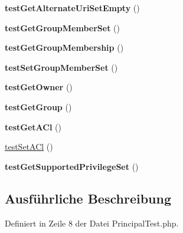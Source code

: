 \begin{DoxyCompactItemize}
{\bfseries test\+Get\+Alternate\+Uri\+Set\+Empty} ()
\item 
\mbox{\label{class_sabre_1_1_d_a_v_a_c_l_1_1_principal_test_af325bbd83431545cb5587f68870c4732}} 
{\bfseries test\+Get\+Group\+Member\+Set} ()
\item 
\mbox{\label{class_sabre_1_1_d_a_v_a_c_l_1_1_principal_test_a02a84103d98290043b4d15bee3043be4}} 
{\bfseries test\+Get\+Group\+Membership} ()
\item 
\mbox{\label{class_sabre_1_1_d_a_v_a_c_l_1_1_principal_test_af71deaaeff46816a259ecf660204a1c1}} 
{\bfseries test\+Set\+Group\+Member\+Set} ()
\item 
\mbox{\label{class_sabre_1_1_d_a_v_a_c_l_1_1_principal_test_a494f603d9cd630b0c55f0ec63707d49e}} 
{\bfseries test\+Get\+Owner} ()
\item 
\mbox{\label{class_sabre_1_1_d_a_v_a_c_l_1_1_principal_test_a3a13e8b6ee9f57ee02257c4c72212630}} 
{\bfseries test\+Get\+Group} ()
\item 
\mbox{\label{class_sabre_1_1_d_a_v_a_c_l_1_1_principal_test_ad8b13dc60d4c10fe8da317d6a0eb9ebd}} 
{\bfseries test\+Get\+A\+Cl} ()
\item 
\mbox{\hyperlink{class_sabre_1_1_d_a_v_a_c_l_1_1_principal_test_a33e587f3020a6605de75adc7e803c461}{test\+Set\+A\+Cl}} ()
\item 
\mbox{\label{class_sabre_1_1_d_a_v_a_c_l_1_1_principal_test_a3028d01a9fd25a3d82c51cbdc52b6c6c}} 
{\bfseries test\+Get\+Supported\+Privilege\+Set} ()
\end{DoxyCompactItemize}


\subsection{Ausführliche Beschreibung}


Definiert in Zeile 8 der Datei Principal\+Test.\+php.



